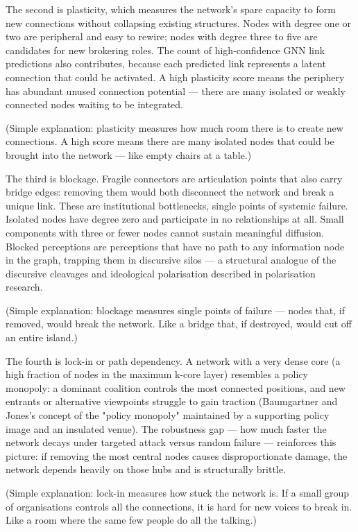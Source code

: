 \documentclass[11pt,a4paper]{article}
\begin{document}
The second is plasticity, which measures the network's spare capacity to
form new connections without collapsing existing structures. Nodes with
degree one or two are peripheral and easy to rewire; nodes with degree
three to five are candidates for new brokering roles. The count of
high-confidence GNN link predictions also contributes, because each
predicted link represents a latent connection that could be activated.
A high plasticity score means the periphery has abundant unused
connection potential — there are many isolated or weakly connected nodes
waiting to be integrated.

(Simple explanation: plasticity measures how much room there is to create
new connections. A high score means there are many isolated nodes that
could be brought into the network — like empty chairs at a table.)

The third is blockage. Fragile connectors are articulation points that
also carry bridge edges: removing them would both disconnect the network
and break a unique link. These are institutional bottlenecks, single
points of systemic failure. Isolated nodes have degree zero and
participate in no relationships at all. Small components with three or
fewer nodes cannot sustain meaningful diffusion. Blocked perceptions are
perceptions that have no path to any information node in the graph,
trapping them in discursive silos — a structural analogue of the
discursive cleavages and ideological polarisation described in
polarisation research.

(Simple explanation: blockage measures single points of failure — nodes
that, if removed, would break the network. Like a bridge that, if
destroyed, would cut off an entire island.)

The fourth is lock-in or path dependency. A network with a very dense
core (a high fraction of nodes in the maximum k-core layer) resembles a
policy monopoly: a dominant coalition controls the most connected
positions, and new entrants or alternative viewpoints struggle to gain
traction (Baumgartner and Jones's concept of the "policy monopoly"
maintained by a supporting policy image and an insulated venue). The
robustness gap — how much faster the network decays under targeted
attack versus random failure — reinforces this picture: if removing the
most central nodes causes disproportionate damage, the network depends
heavily on those hubs and is structurally brittle.

(Simple explanation: lock-in measures how stuck the network is. If a
small group of organisations controls all the connections, it is hard
for new voices to break in. Like a room where the same few people do
all the talking.)
\end{document}
